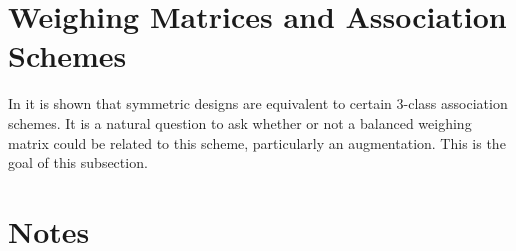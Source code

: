 \documentclass[../../main]{subfiles}
\begin{document}
 \section{\centering Weighing Matrices and Association Schemes}
 
 In \cite{distance-regular-graphs} it is shown that symmetric designs are equivalent to certain 3-class association schemes. It is a natural question to ask whether or not a balanced weighing matrix could be related to this scheme, particularly an augmentation. This is the goal of this subsection.
 
 \dinkus
 
 
 
 \singlespace
 
 \fancyhf{}

 \fancyhead[RO,LE]{\thepage}

 \section*{\centering Notes}
 \theenotes
 
 \doublespacing
 
 \biblio
\end{document}
